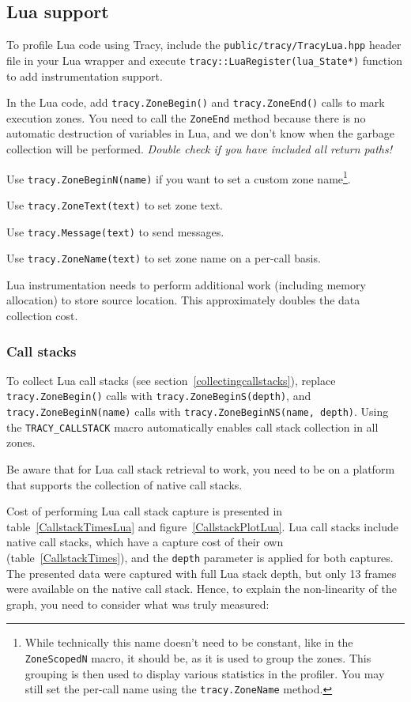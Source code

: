 \documentclass[hidelinks,titlepage,a4paper,twoside]{article}
\begin{document}
\subsection{Lua support}

To profile Lua code using Tracy, include the \texttt{public/tracy/TracyLua.hpp} header file in your Lua wrapper and execute \texttt{tracy::LuaRegister(lua\_State*)} function to add instrumentation support.

In the Lua code, add \texttt{tracy.ZoneBegin()} and \texttt{tracy.ZoneEnd()} calls to mark execution zones. You need to call the \texttt{ZoneEnd} method because there is no automatic destruction of variables in Lua, and we don't know when the garbage collection will be performed. \emph{Double check if you have included all return paths!}

Use \texttt{tracy.ZoneBeginN(name)} if you want to set a custom zone name\footnote{While technically this name doesn't need to be constant, like in the \texttt{ZoneScopedN} macro, it should be, as it is used to group the zones. This grouping is then used to display various statistics in the profiler. You may still set the per-call name using the \texttt{tracy.ZoneName} method.}.

Use \texttt{tracy.ZoneText(text)} to set zone text.

Use \texttt{tracy.Message(text)} to send messages.

Use \texttt{tracy.ZoneName(text)} to set zone name on a per-call basis.

Lua instrumentation needs to perform additional work (including memory allocation) to store source location. This approximately doubles the data collection cost.

\subsubsection{Call stacks}

To collect Lua call stacks (see section~\ref{collectingcallstacks}), replace \texttt{tracy.ZoneBegin()} calls with \texttt{tracy.ZoneBeginS(depth)}, and \texttt{tracy.ZoneBeginN(name)} calls with \texttt{tracy.ZoneBeginNS(name, depth)}. Using the \texttt{TRACY\_CALLSTACK} macro automatically enables call stack collection in all zones.

Be aware that for Lua call stack retrieval to work, you need to be on a platform that supports the collection of native call stacks.

Cost of performing Lua call stack capture is presented in table~\ref{CallstackTimesLua} and figure~\ref{CallstackPlotLua}. Lua call stacks include native call stacks, which have a capture cost of their own (table~\ref{CallstackTimes}), and the \texttt{depth} parameter is applied for both captures. The presented data were captured with full Lua stack depth, but only 13 frames were available on the native call stack. Hence, to explain the non-linearity of the graph, you need to consider what was truly measured:
\end{document}
